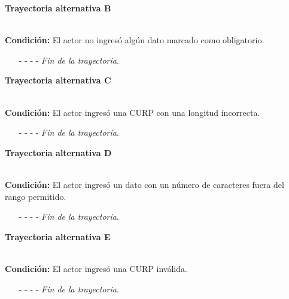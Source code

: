 \hypertarget{CU3-1:TAB}{\textbf{Trayectoria alternativa B}}\\
\noindent \textbf{Condición:} El actor no ingresó algún dato marcado como obligatorio.
\begin{enumerate}
	\UCpaso[\UCsist] Muestra el mensaje  señalando el campo que presenta el error en la pantalla .
	\UCpaso Regresa al paso \ref{CU3.1-P3} de la trayectoria principal.
	\item[- -] - - {\em {Fin de la trayectoria}}.%
\end{enumerate}
\hypertarget{CU3-1:TAC}{\textbf{Trayectoria alternativa C}}\\
\noindent \textbf{Condición:} El actor ingresó una CURP con una longitud incorrecta.
\begin{enumerate}
	\UCpaso[\UCsist] Muestra el mensaje  y señala el campo que presenta el error en la pantalla .
	\UCpaso Regresa al paso \ref{CU3.1-P3} de la trayectoria principal.
	\item[- -] - - {\em {Fin de la trayectoria}}.%
\end{enumerate}
\hypertarget{CU3-1:TAD}{\textbf{Trayectoria alternativa D}}\\
\noindent \textbf{Condición:} El actor ingresó un dato con un número de caracteres fuera del rango permitido.
\begin{enumerate}
	\UCpaso[\UCsist] Muestra el mensaje  señalando el campo que presenta el error en la pantalla .
	\UCpaso Regresa al paso \ref{CU3.1-P3} de la trayectoria principal.
	\item[- -] - - {\em {Fin de la trayectoria}}.%
\end{enumerate}
\hypertarget{CU3-1:TAE}{\textbf{Trayectoria alternativa E}}\\
\noindent \textbf{Condición:} El actor ingresó una CURP inválida.
\begin{enumerate}
	\UCpaso[\UCsist] Muestra el mensaje  señalando el campo que presenta el error en la pantalla .
	\UCpaso Regresa al paso \ref{CU3.1-P3} de la trayectoria principal.
	\item[- -] - - {\em {Fin de la trayectoria}}.
\end{enumerate}
